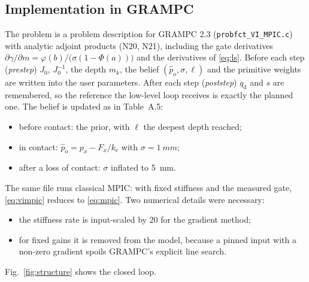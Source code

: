 \documentclass[11pt,a4paper]{article}
\newcommand{\qd}{q_{\mathrm{d}}}
\newcommand{\phat}{\hat{p}_{\mathrm{o}}}
\newcommand{\ke}{k_{\mathrm{e}}}
\begin{document}
\subsection{Implementation in GRAMPC}
The problem is a problem description for GRAMPC 2.3 \cite{grampc} (\texttt{probfct\_VI\_MPIC.c}) with analytic adjoint
products (N20, N21), including the gate derivatives $\partial\gamma/\partial m=\varphi(b)/\bigl(\sigma(1-\Phi(a))\bigr)$
and the derivatives of \eqref{eq:ls}. Before each step (\emph{prestep}) $J_0$, $J_0^{-1}$, the depth
$m_k$, the belief $(\phat,\sigma,\ell)$ and the primitive weights are written into the user parameters.
After each step (\emph{poststep}) $\qd$ and $s$ are remembered, so the reference the low-level loop
receives is exactly the planned one. The belief is updated as in Table~A.5:
\begin{itemize}[leftmargin=14pt]
\item before contact: the prior, with $\ell$ the deepest depth reached;
\item in contact: $\phat=p_x-F_x/\ke$ with $\sigma=\SI{1}{mm}$;
\item after a loss of contact: $\sigma$ inflated to \SI{5}{mm}.
\end{itemize}
The same file runs classical MPIC: with fixed stiffness and the measured gate, \eqref{eq:vimpic} reduces
to \eqref{eq:mpic}. Two numerical details were necessary:
\begin{itemize}[leftmargin=14pt]
\item the stiffness rate is input-scaled by 20 for the gradient method;
\item for fixed gains it is removed from the model, because a pinned input with a non-zero gradient spoils
  GRAMPC's explicit line search.
\end{itemize}
Fig.~\ref{fig:structure} shows the closed loop.
\end{document}
